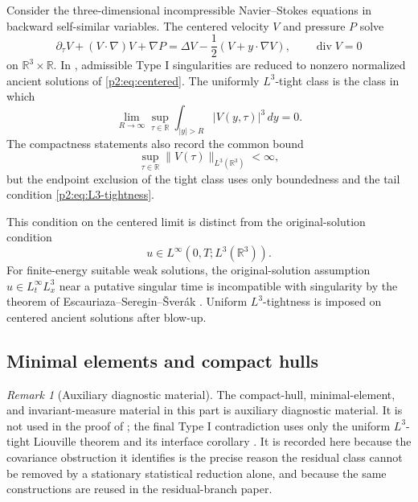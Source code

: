 \documentclass[11pt]{amsart}
\theoremstyle{plain}
\theoremstyle{definition}
\theoremstyle{remark}
\newtheorem{remark}[remark]{Remark}
\numberwithin{equation}{section}
\newcommand{\R}{\mathbb R}
\newcommand{\divergence}{\operatorname{div}}
\begin{document}
Consider the three-dimensional incompressible Navier--Stokes equations in
backward self-similar variables.  The centered velocity \(V\) and pressure \(P\)
solve
\begin{equation}\label{p2:eq:centered}
   \partial_\tau V+(V\cdot\nabla)V+\nabla P
   =
   \Delta V-\frac12(V+y\cdot\nabla V),
   \qquad \divergence V=0
\end{equation}
on \(\R^3\times\R\).  In , admissible Type I
singularities are reduced to nonzero normalized ancient solutions of
\eqref{p2:eq:centered}.  The uniformly \(L^3\)-tight class is the class in which
\begin{equation}\label{p2:eq:L3-tightness}
   \lim_{R\to\infty}
   \sup_{\tau\in\R}\int_{|y|>R}|V(y,\tau)|^3\,dy=0 .
\end{equation}
The compactness statements also record the common bound
\begin{equation}\label{p2:eq:L3-bound}
   \sup_{\tau\in\R}\|V(\tau)\|_{L^3(\R^3)}<\infty ,
\end{equation}
but the endpoint exclusion of the tight class uses only boundedness and the
tail condition \eqref{p2:eq:L3-tightness}.

This condition on the centered limit is distinct from the original-solution condition
\[
   u\in L^\infty(0,T;L^3(\R^3)).
\]
For finite-energy suitable weak solutions, the original-solution assumption
\(u\in L^\infty_tL^3_x\) near a putative singular time is incompatible with
singularity by the theorem of Escauriaza--Seregin--\v{S}ver\'ak
\cite{ESS2003}.  Uniform \(L^3\)-tightness is imposed on centered ancient
solutions after blow-up.

\subsection{Minimal elements and compact hulls}

\begin{remark}[Auxiliary diagnostic material]
\label{p2:rem:auxiliary-dynamical-material}
The compact-hull, minimal-element, and invariant-measure material in this
part is auxiliary diagnostic material.  It is not used in the proof of
; the final Type I contradiction uses only the
uniform \(L^3\)-tight Liouville theorem
 and its interface corollary
.  It is recorded here because the
covariance obstruction it identifies is the precise reason the residual
class cannot be removed by a stationary statistical reduction alone, and
because the same constructions are reused in the residual-branch paper.
\end{remark}
\end{document}
